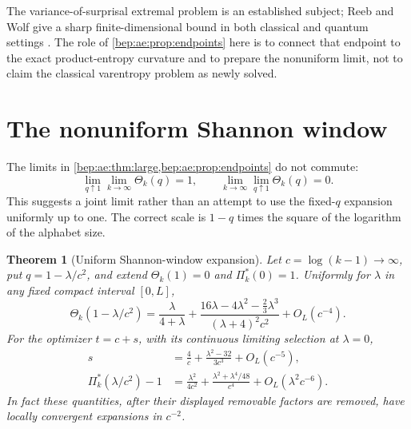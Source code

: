 \documentclass[11pt]{article}
\numberwithin{equation}{section}
\newtheorem{theorem}{Theorem}[section]
\theoremstyle{definition}
\theoremstyle{remark}
\begin{document}
The variance-of-surprisal extremal problem is an established subject;
Reeb and Wolf give a sharp finite-dimensional bound in both classical
and quantum settings \cite{bep:ae:reeb}. The role of \cref{bep:ae:prop:endpoints} here
is to connect that endpoint to the exact product-entropy curvature and
to prepare the nonuniform limit, not to claim the classical varentropy
problem as newly solved.

\section{The nonuniform Shannon window}\label{bep:ae:sec:window}
The limits in \cref{bep:ae:thm:large,bep:ae:prop:endpoints} do not commute:
\[
 \lim_{q\uparrow1}\lim_{k\to\infty}\Theta_k(q)=1,
 \qquad
 \lim_{k\to\infty}\lim_{q\uparrow1}\Theta_k(q)=0.
\]
This suggests a joint limit rather than an attempt to use the
fixed-$q$ expansion uniformly up to one. The correct scale is
$1-q$ times the square of the logarithm of the alphabet size.

\begin{theorem}[Uniform Shannon-window expansion]\label{bep:ae:thm:window}
Let $c=\log(k-1)\to\infty$, put $q=1-\lambda/c^2$, and extend
$\Theta_k(1)=0$ and $\Pi^{*}_k(0)=1$. Uniformly for $\lambda$ in any fixed compact interval
$[0,L]$,
\begin{equation}\label{bep:ae:eq:windowtheta}
 \Theta_k(1-\lambda/c^2)
 =\frac{\lambda}{4+\lambda}
 +\frac{16\lambda-4\lambda^2-\tfrac23\lambda^3}
       {(\lambda+4)^2c^2}
 +O_L(c^{-4}).
\end{equation}
For the optimizer $t=c+s$, with its continuous limiting selection at
$\lambda=0$,
\begin{align}
 s&=\frac4c+\frac{\lambda^2-32}{3c^3}+O_L(c^{-5}),\label{bep:ae:eq:windows}\\
 \Pi^{*}_k(\lambda/c^2)-1
 &=\frac{\lambda^2}{4c^2}
   +\frac{\lambda^2+\lambda^4/48}{c^4}
   +O_L(\lambda^2c^{-6}).\label{bep:ae:eq:windowR}
\end{align}
In fact these quantities, after their displayed removable factors are
removed, have locally convergent expansions in $c^{-2}$.
\end{theorem}
\end{document}
